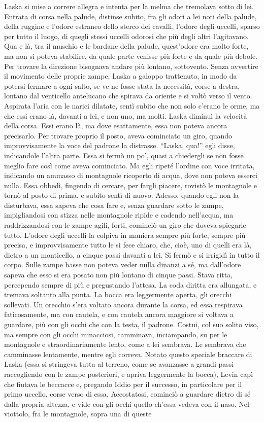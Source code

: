 Laska si mise a correre allegra e intenta per la melma che tremolava sotto di lei. Entrata di corsa nella palude, distinse subito, fra gli odori a lei noti della palude, della ruggine e l'odore estraneo dello sterco dei cavalli, l'odore degli uccelli, sparso per tutto il luogo, di quegli stessi uccelli odorosi che più degli altri l'agitavano. Qua e là, tra il muschio e le bardane della palude, quest'odore era molto forte, ma non si poteva stabilire, da quale parte venisse più forte e da quale più debole. Per trovare la direzione bisognava andare più lontano, sottovento. Senza avvertire il movimento delle proprie zampe, Laska a galoppo trattenuto, in modo da potersi fermare a ogni salto, se ve ne fosse stata la necessità, corse a destra, lontano dal venticello antelucano che spirava da oriente e si voltò verso il vento. Aspirata l'aria con le narici dilatate, sentì subito che non solo c'erano le orme, ma che essi erano là, davanti a lei, e non uno, ma molti. Laska diminuì la velocità della corsa. Essi erano là, ma dove esattamente, essa non poteva ancora precisarlo. Per trovare proprio il posto, aveva cominciato un giro, quando improvvisamente la voce del padrone la distrasse. ``Laska, qua!'' egli disse, indicandole l'altra parte. Essa si fermò un po', quasi a chiedergli se non fosse meglio fare così come aveva cominciato. Ma egli ripeté l'ordine con voce irritata, indicando un ammasso di montagnole ricoperto di acqua, dove non poteva esserci nulla. Essa obbedì, fingendo di cercare, per fargli piacere, rovistò le montagnole e tornò al posto di prima, e subito sentì di nuovo. Adesso, quando egli non la disturbava, essa sapeva che cosa fare e, senza guardare sotto le zampe, impigliandosi con stizza nelle montagnole ripide e cadendo nell'acqua, ma raddrizzandosi con le zampe agili, forti, cominciò un giro che doveva spiegarle tutto. L'odore degli uccelli la colpiva in maniera sempre più forte, sempre più precisa, e improvvisamente tutto le si fece chiaro, che, cioè, uno di quelli era là, dietro a un monticello, a cinque passi davanti a lei. Si fermò e si irrigidì in tutto il corpo. Sulle zampe basse non poteva veder nulla dinanzi a sé, ma dall'odore sapeva che esso si era posato non più lontano di cinque passi. Stava ritta, percependo sempre di più e pregustando l'attesa. La coda diritta era allungata, e tremava soltanto alla punta. La bocca era leggermente aperta, gli orecchi sollevati. Un orecchio s'era voltato ancora durante la corsa, ed essa respirava faticosamente, ma con cautela, e con cautela ancora maggiore si voltava a guardare, più con gli occhi che con la testa, il padrone. Costui, col suo solito viso, ma sempre con gli occhi minacciosi, camminava, inciampando, su per le montagnole e straordinariamente lento, come a lei sembrava. Le sembrava che camminasse lentamente, mentre egli correva. Notato questo speciale braccare di Laska (essa si stringeva tutta al terreno, come se avanzasse a grandi passi raccogliendo con le zampe posteriori, e apriva leggermente la bocca), Levin capì che fiutava le beccacce e, pregando Iddio per il successo, in particolare per il primo uccello, corse verso di essa. Accostatosi, cominciò a guardare dietro di sé dalla propria altezza, e vide con gli occhi quello ch'essa vedeva con il naso. Nel viottolo, fra le montagnole, sopra una di queste 
